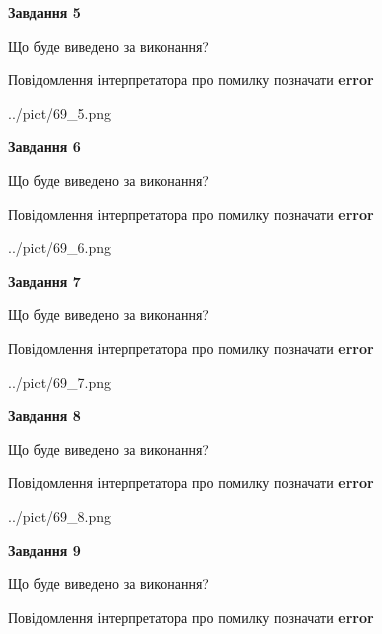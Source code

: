 \documentclass[11pt, ukrainian]{article}
\begin{document}
{\begin {large}
{\begin {center}\textbf{Завдання 5}\end {center}}\par
Що буде виведено за виконання? \par
Повідомлення інтерпретатора про помилку позначати \textbf{error}

\begin{center}
	{../pict/69_5.png}
\end{center}
\newpage

{\begin {center}\textbf{Завдання 6}\end {center}}\par
Що буде виведено за виконання? \par
Повідомлення інтерпретатора про помилку позначати \textbf{error}

\begin{center}
	{../pict/69_6.png}
\end{center}
\newpage

{\begin {center}\textbf{Завдання 7}\end {center}}\par
Що буде виведено за виконання? \par
Повідомлення інтерпретатора про помилку позначати \textbf{error}

\begin{center}
	{../pict/69_7.png}
\end{center}
\newpage

{\begin {center}\textbf{Завдання 8}\end {center}}\par
Що буде виведено за виконання? \par
Повідомлення інтерпретатора про помилку позначати \textbf{error}

\begin{center}
	{../pict/69_8.png}
\end{center}
\newpage

{\begin {center}\textbf{Завдання 9}\end {center}}\par
Що буде виведено за виконання? \par
Повідомлення інтерпретатора про помилку позначати \textbf{error}


\end{large}}
\end{document}
